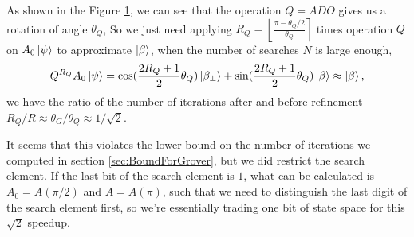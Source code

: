 \documentclass[a4paper,10pt]{book}
\numberwithin{equation}{section}
\begin{document}
\begin{figure}[h]
    \centering
    \caption{}
    \label{fig:Abdulrahman}
\end{figure}

As shown in the Figure \ref{fig:Abdulrahman}, we can see that the operation $Q=ADO$ gives us a rotation of angle $\theta_{Q}$, So we just need applying $R_{Q}=\left\lfloor\frac{\pi-\theta_{Q}/2}{\theta_{Q}}\right\rceil$ times operation $Q$ on $A_{0}\ket{\psi}$ to approximate $\ket{\beta}$, when the number of searches $N$ is large enough,
\begin{equation}
    Q^{R_{Q}}A_{0}\ket{\psi}=\cos(\frac{2R_{Q}+1}{2}\theta_{Q})\ket{\beta_{\perp}}+\sin(\frac{2R_{Q}+1}{2}\theta_{Q})\ket{\beta}\approx\ket{\beta},
\end{equation}
we have the ratio of the number of iterations after and before refinement $R_{Q}/R\approx\theta_{G}/\theta_{Q}\approx 1/\sqrt{2}$.

It seems that this violates the lower bound on the number of iterations we computed in section \ref{sec:BoundForGrover}, but we did restrict the search element. If the last bit of the search element is $1$, what can be calculated is $A_{0}=A(\pi/2)$ and $A=A(\pi)$, such that we need to distinguish the last digit of the search element first, so we're essentially trading one bit of state space for this $\sqrt{2}$ speedup.





\end{document}
